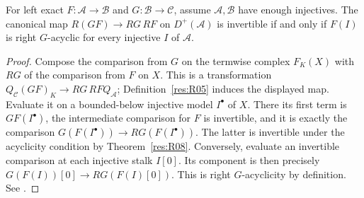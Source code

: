 \begin{theorem}\label{res:R12}
For left exact \(F:\mathcal A\to\mathcal B\) and \(G:\mathcal B\to\mathcal C\),
assume \(\mathcal A,\mathcal B\) have enough injectives. The canonical map
\(R(GF)\to RG\,RF\) on \(D^+(\mathcal A)\) is invertible if and only if
\(F(I)\) is right \(G\)-acyclic for every injective \(I\) of \(\mathcal A\).
\end{theorem}
\begin{proof}
Compose the comparison from \(G\) on the termwise complex \(F_K(X)\)
with \(RG\) of the comparison from \(F\) on \(X\). This is a
transformation \(Q_{\mathcal C}(GF)_K\to RG\,RF Q_{\mathcal A}\);
Definition~\ref{res:R05} induces the displayed map. Evaluate it on a
bounded-below injective model \(I^\bullet\) of \(X\). There its first
term is \(GF(I^\bullet)\), the intermediate comparison for \(F\)
is invertible, and it is exactly the comparison
\(G(F(I^\bullet))\to RG(F(I^\bullet))\).
The latter is invertible under the acyclicity condition by
Theorem~\ref{res:R08}. Conversely, evaluate an invertible comparison
at each injective stalk \(I[0]\). Its component is then precisely
\(G(F(I))[0]\to RG(F(I)[0])\). This is right \(G\)-acyclicity by
definition. See \cite[Tags 05T2, 015M]{stacks-derived}.
\end{proof}


